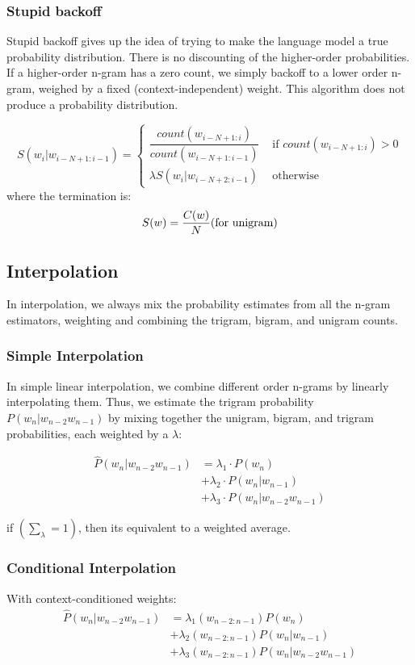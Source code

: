 \subsubsection{Stupid backoff}
Stupid backoff gives up the idea of trying to make the language model a true probability distribution. There is no discounting of the higher-order probabilities. If a higher-order n-gram has a zero count, we simply backoff to a lower order n-gram, weighed by a fixed (context-independent) weight. This algorithm does not produce a probability distribution.

\[
    S(w_i|w_{i-N+1:i-1}) = \begin{cases}
        \displaystyle\dfrac{count(w_{i-N+1:i})}{count(w_{i-N+1:i-1})} & \text{ if $count(w_{i-N+1:i}) > 0$}\\[0.2cm]
        \lambda S(w_i|w_{i-N+2:i-1}) & \text{ otherwise}
    \end{cases}
\]
where the termination is:
\[
    S(w) = \displaystyle\dfrac{C(w)}{N} \hfill \text{(for unigram)}
\]

\subsection{Interpolation}
In interpolation, we always mix the probability estimates from all the n-gram estimators, weighting and combining the trigram, bigram, and unigram counts.

\subsubsection{Simple Interpolation}
In simple linear interpolation, we combine different order n-grams by linearly interpolating them. Thus, we estimate the trigram probability $P(w_n|w_{n-2}w_{n-1})$ by mixing together the unigram, bigram, and trigram probabilities, each weighted by a $\lambda$:

\begin{align*}
    \hat{P}(w_n|w_{n-2}w_{n-1}) &= \lambda_1 \cdot P(w_n)  \\ 
    &+ \lambda_2 \cdot P(w_n|w_{n-1}) \\ 
    &+ \lambda_3 \cdot P(w_n|w_{n-2}w_{n-1}) 
\end{align*}


if \( \left( \sum_\lambda = 1 \right)\), then its equivalent to a weighted average.

\subsubsection{Conditional Interpolation}
With context-conditioned weights:
\begin{align*}
    \hat{P}(w_n|w_{n-2}w_{n-1}) &= \lambda_1(w_{n-2:n-1})P(w_n) \\ 
    &+ \lambda_2(w_{n-2:n-1})P(w_n|w_{n-1}) \\ 
    &+ \lambda_3(w_{n-2:n-1})P(w_n|w_{n-2}w_{n-1}) \\ 
\end{align*}

